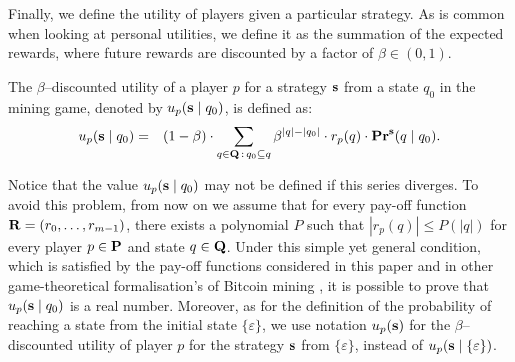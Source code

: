 Finally, we define the utility of players given a particular strategy. 
As is common
when looking at personal utilities, we define it as the summation of the expected rewards, 
where future rewards are discounted by a factor of $\beta \in (0,1)$. 
%
\begin{mydef}
\label{def-utility}
The $\beta$--discounted utility of a player $p$ for a strategy $\mathbf{s}$ from a state $q_0$ in
the mining game, denoted by $u_p(\mathbf{s} \mid q_0)$, is defined as:
\begin{eqnarray*}
u_p(\mathbf{s} \mid q_0) & = & (1 - \beta) \cdot \sum_{q \in \mathbf{Q} \,:\, q_0 \subseteq q} \beta^{|q|-|q_0|} \cdot r_p(q) \cdot \mathbf{Pr}^{\mathbf{s}}(q \mid q_0).
\end{eqnarray*}
\end{mydef}
Notice that the value $u_p(\mathbf{s} \mid q_0)$ may not be defined if this series %
diverges. To avoid this problem, from now on we assume that for every pay-off function $\mathbf{R} = (r_0, \ldots, r_{m-1})$, there exists a polynomial $P$ such that $|r_p(q)| \leq P(|q|)$ for every player $p \in \mathbf{P}$ and state $q \in \mathbf{Q}$. Under this simple yet general condition, which is satisfied by the pay-off functions considered in this paper and in other game-theoretical formalisation's of Bitcoin mining \cite{mininggames:2016}, it is possible to prove that $u_p(\mathbf{s} \mid q_0)$ is a real number. Moreover, as for the definition of the probability of reaching a state from the initial state $\{\varepsilon\}$, we use notation $u_p(\mathbf{s})$ for the $\beta$--discounted utility of player $p$ for the strategy $\mathbf{s}$ from $\{\varepsilon\}$, instead of $u_p(\mathbf{s} \mid \{\varepsilon\})$. 


